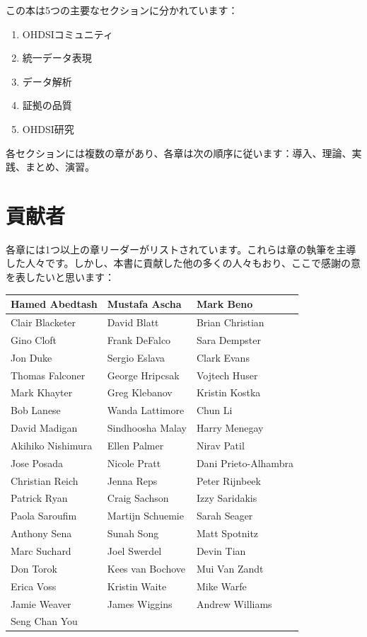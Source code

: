 \documentclass[
  11pt]{book}
\providecommand{\tightlist}{%
  \setlength{\itemsep}{0pt}\setlength{\parskip}{0pt}}
\theoremstyle{definition}
\theoremstyle{definition}
\theoremstyle{definition}
\theoremstyle{definition}
\theoremstyle{remark}
\begin{document}
この本は5つの主要なセクションに分かれています：

\begin{enumerate}
\def\labelenumi{\Roman{enumi})}
\tightlist
\item
  OHDSIコミュニティ
\item
  統一データ表現
\item
  データ解析
\item
  証拠の品質
\item
  OHDSI研究
\end{enumerate}

各セクションには複数の章があり、各章は次の順序に従います：導入、理論、実践、まとめ、演習。

\section*{貢献者}\label{ux8ca2ux732eux8005}

各章には1つ以上の章リーダーがリストされています。これらは章の執筆を主導した人々です。しかし、本書に貢献した他の多くの人々もおり、ここで感謝の意を表したいと思います：

\begin{tabular}{l|l|l}
\hline
Hamed Abedtash & Mustafa Ascha & Mark Beno\\
\hline
Clair Blacketer & David Blatt & Brian Christian\\
\hline
Gino Cloft & Frank DeFalco & Sara Dempster\\
\hline
Jon Duke & Sergio Eslava & Clark Evans\\
\hline
Thomas Falconer & George Hripcsak & Vojtech Huser\\
\hline
Mark Khayter & Greg Klebanov & Kristin Kostka\\
\hline
Bob Lanese & Wanda Lattimore & Chun Li\\
\hline
David Madigan & Sindhoosha Malay & Harry Menegay\\
\hline
Akihiko Nishimura & Ellen Palmer & Nirav Patil\\
\hline
Jose Posada & Nicole Pratt & Dani Prieto-Alhambra\\
\hline
Christian Reich & Jenna Reps & Peter Rijnbeek\\
\hline
Patrick Ryan & Craig Sachson & Izzy Saridakis\\
\hline
Paola Saroufim & Martijn Schuemie & Sarah Seager\\
\hline
Anthony Sena & Sunah Song & Matt Spotnitz\\
\hline
Marc Suchard & Joel Swerdel & Devin Tian\\
\hline
Don Torok & Kees van Bochove & Mui Van Zandt\\
\hline
Erica Voss & Kristin Waite & Mike Warfe\\
\hline
Jamie Weaver & James Wiggins & Andrew Williams\\
\hline
Seng Chan You &  & \\
\hline
\end{tabular}
\end{document}
